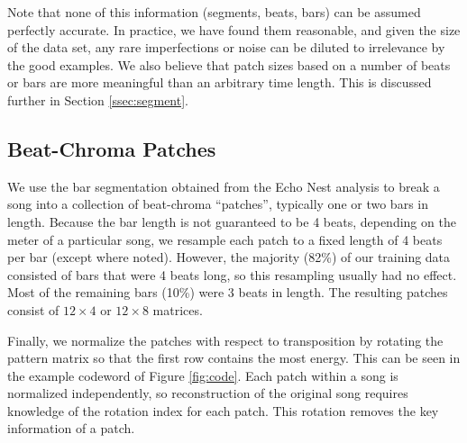 \documentclass{article}
\newcommand{\eg}{e.g.~}
\begin{document}
Note that none of this information (segments, beats, bars)
can be assumed perfectly accurate.
In practice, we have found them reasonable, 
and given the size of the data set, any rare imperfections or noise
can be diluted to irrelevance by the good examples.  
We also believe that patch sizes based on a number of beats or bars are more
meaningful than an arbitrary time length. This is discussed further in 
Section \ref{ssec:segment}.


\subsection{Beat-Chroma Patches} \label{ssec:beatpatch}

We use the bar segmentation obtained from the Echo Nest analysis to
break a song into a collection of beat-chroma ``patches'', typically
one or two bars in length.
%
Because the bar length is not guaranteed to be 4 beats, 
depending on the meter of a particular
song, we resample each patch to a fixed length of 4 beats
per bar (except where noted).  However, the majority (82\%) of our training data
consisted of bars that were 4 beats long, so this resampling 
usually had no effect.  Most of the remaining bars (10\%) were 3 beats in
length.
The resulting patches consist of $12 \times 4$ or $12 \times 8$ matrices.

Finally, we normalize the patches with respect to transposition by rotating
the pattern matrix so that the first row contains the most
energy. This can be seen in the example codeword of Figure \ref{fig:code}.
Each patch within a song is normalized independently, so
reconstruction of the original song requires knowledge of the
rotation index for each patch. This rotation removes the key information
of a patch.
\end{document}
